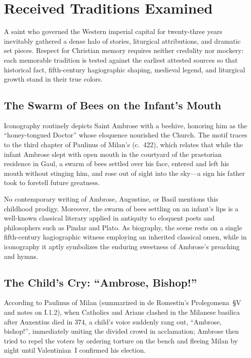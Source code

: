 \section{Received Traditions Examined}

A saint who governed the Western imperial capital for twenty-three years inevitably gathered a dense halo of stories, liturgical attributions, and dramatic set pieces. Respect for Christian memory requires neither credulity nor mockery: each memorable tradition is tested against the earliest attested sources so that historical fact, fifth-century hagiographic shaping, medieval legend, and liturgical growth stand in their true colors.

\subsection{The Swarm of Bees on the Infant's Mouth}

Iconography routinely depicts Saint Ambrose with a beehive, honoring him as the ``honey-tongued Doctor'' whose eloquence nourished the Church. The motif traces to the third chapter of Paulinus of Milan's  (c.~422), which relates that while the infant Ambrose slept with open mouth in the courtyard of the praetorian residence in Gaul, a swarm of bees settled over his face, entered and left his mouth without stinging him, and rose out of sight into the sky---a sign his father took to foretell future greatness.

No contemporary writing of Ambrose, Augustine, or Basil mentions this childhood prodigy. Moreover, the swarm of bees settling on an infant's lips is a well-known classical literary  applied in antiquity to eloquent poets and philosophers such as Pindar and Plato. As biography, the scene rests on a single fifth-century hagiographic witness employing an inherited classical omen, while in iconography it aptly symbolizes the enduring sweetness of Ambrose's preaching and hymns.

\subsection{The Child's Cry: ``Ambrose, Bishop!''}

According to Paulinus of Milan (summarized in de Romestin's Prolegomena~\S V and notes on  I.1.2), when Catholics and Arians clashed in the Milanese basilica after Auxentius died in 374, a child's voice suddenly rang out, ``Ambrose, bishop!'', immediately uniting the divided crowd in acclamation; Ambrose then tried to repel the voters by ordering torture on the bench and fleeing Milan by night until Valentinian~I confirmed his election.

